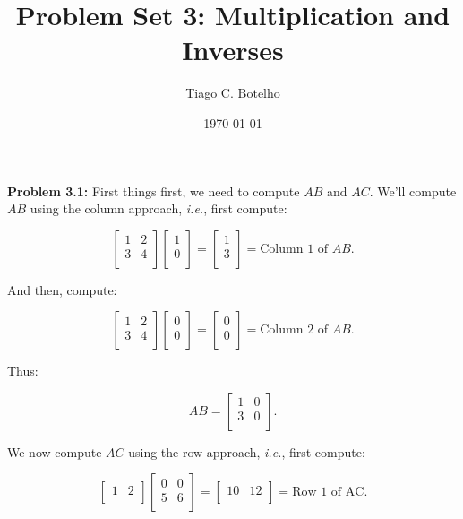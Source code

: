 \documentclass{article}
\title{Problem Set 3: Multiplication and Inverses}
\author{Tiago C. Botelho}
\date{\today}
\begin{document}
\maketitle

\noindent \textbf{Problem 3.1:} First things first, we need to compute $AB$ and $AC$. We'll compute $AB$ using the column approach, \textit{i.e.}, first compute:

\[
\begin{bmatrix}
1 & 2\\
3 & 4\\
\end{bmatrix}
\begin{bmatrix}
1\\
0\\
\end{bmatrix}
=
\begin{bmatrix}
1\\
3\\
\end{bmatrix}
= \text{Column 1 of } AB.
\]

And then, compute:

\[
\begin{bmatrix}
1 & 2\\
3 & 4\\
\end{bmatrix}
\begin{bmatrix}
0\\
0\\
\end{bmatrix}
=
\begin{bmatrix}
0\\
0\\
\end{bmatrix}
= \text{Column 2 of } AB.
\]

Thus:

\[
AB = \begin{bmatrix}
1 & 0\\
3 & 0\\
\end{bmatrix}.
\]

We now compute $AC$ using the row approach, \textit{i.e.}, first compute:

\[
\begin{bmatrix}
1 & 2\\
\end{bmatrix}
\begin{bmatrix}
0 & 0\\
5 & 6\\
\end{bmatrix}
=
\begin{bmatrix}
10 & 12\\
\end{bmatrix}
= \text{Row 1 of AC}.
\]
\end{document}
